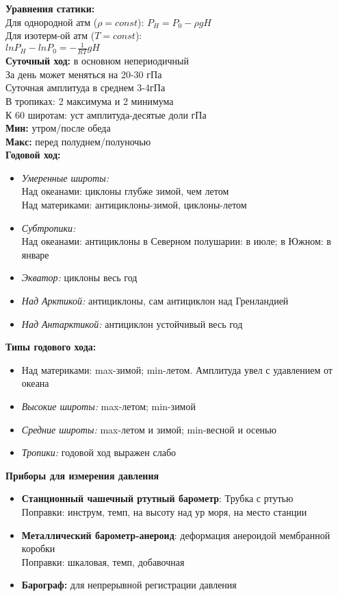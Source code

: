 \par \textbf{Уравнения статики:}\\ 
Для однородной атм ($\rho=const$): $P_{H}=P_{0}-\rho gH$ \\ 
Для изотерм-ой атм ($T=const$): \\
$lnP_{H}-lnP_{0}=-\frac{1}{RT}gH$ \\

\textbf{Суточный ход:} в основном непериодичный\\ 
За день может меняться на 20-30 гПа\\ 
Суточная амплитуда в среднем 3-4гПа\\ 
В тропиках: 2 максимума и 2 минимума\\ 
К 60 широтам: уст амплитуда-десятые доли гПа\\ 
\textbf{Мин:} утром/после обеда \\
\textbf{Макс:} перед полуднем/полуночью \\
\textbf{Годовой ход:} 
\begin{itemize} 
\item \textit{Умеренные широты:} \\ 
Над океанами: циклоны глубже зимой, чем летом\\ 
Над материками: антициклоны-зимой, циклоны-летом 
\item \textit{Субтропики:} \\ 
Над океанами: антициклоны в Северном полушарии: в июле; в Южном: в январе
\item \textit{Экватор:} циклоны весь год 
\item \textit{Над Арктикой:} антициклоны, сам антициклон над Гренландией 
\item \textit{Над Антарктикой:} антициклон устойчивый весь год 
\end{itemize} 

\par \textbf{Типы годового хода:} 
\begin{itemize} 
\item Над материками: max-зимой; min-летом. Амплитуда увел с удавлением от океана 
\item \textit{Высокие широты:} max-летом; min-зимой 
\item \textit{Средние широты:} max-летом и зимой; min-весной и осенью 
\item \textit{Тропики:} годовой ход выражен слабо 
\end{itemize}

\par \textbf{Приборы для измерения давления} 
\begin{itemize} 
	\item \textbf{Станционный чашечный ртутный барометр}: Трубка с ртутью\\ 
	Поправки: инструм, темп, на высоту над ур моря, на место станции 
	\item \textbf{Металлический барометр-анероид}: деформация анероидой мембранной коробки\\ 
	Поправки: шкаловая, темп, добавочная 
	\item \textbf{Барограф:} для непрерывной регистрации давления
\end{itemize}
\vspace*{5\baselineskip}

